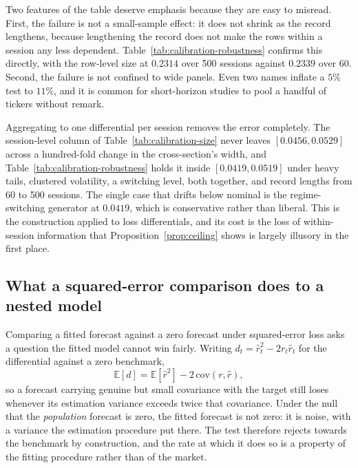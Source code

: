\documentclass{article}
\theoremstyle{plain}
\theoremstyle{remark}
\begin{document}
Two features of the table deserve emphasis because they are easy to misread.
First, the failure is not a small-sample effect: it does not shrink as the
record lengthens, because lengthening the record does not make the rows within a
session any less dependent. Table~\ref{tab:calibration-robustness} confirms this
directly, with the row-level size at $0.2314$ over 500 sessions against $0.2339$
over 60. Second, the failure is not confined to wide panels. Even two names
inflate a $5\%$ test to $11\%$, and it is common for short-horizon studies to
pool a handful of tickers without remark.

Aggregating to one differential per session removes the error completely. The
session-level column of Table~\ref{tab:calibration-size} never leaves
$[0.0456, 0.0529]$ across a hundred-fold change in the cross-section's width,
and Table~\ref{tab:calibration-robustness} holds it inside $[0.0419, 0.0519]$
under heavy tails, clustered volatility, a switching level, both together, and
record lengths from 60 to 500 sessions. The single case that drifts below
nominal is the regime-switching generator at $0.0419$, which is conservative
rather than liberal. This is the \citet{fama1973} construction applied to loss
differentials, and its cost is the loss of within-session information that
Proposition~\ref{prop:ceiling} shows is largely illusory in the first place.



\subsection{What a squared-error comparison does to a nested model}
\label{sec:calibration-nested}

Comparing a fitted forecast against a zero forecast under squared-error loss
asks a question the fitted model cannot win fairly. Writing
$d_t = \hat r_t^2 - 2 r_t \hat r_t$ for the differential against a zero
benchmark,
\begin{equation}
\label{eq:nesting}
\mathbb{E}[d] = \mathbb{E}[\hat r^2] - 2\,\mathrm{cov}(r,\hat r),
\end{equation}
so a forecast carrying genuine but small covariance with the target still loses
whenever its estimation variance exceeds twice that covariance. Under the null
that the \emph{population} forecast is zero, the fitted forecast is not zero: it
is noise, with a variance the estimation procedure put there. The test therefore
rejects towards the benchmark by construction, and the rate at which it does so
is a property of the fitting procedure rather than of the market.
\end{document}
